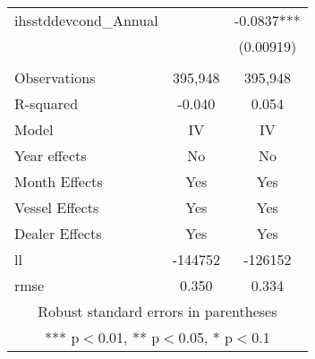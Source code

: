 \begin{tabular}{lcc}
ihsstddevcond\_Annual &  & -0.0837*** \\
 &  & (0.00919) \\
 &  &  \\
Observations & 395,948 & 395,948 \\
R-squared & -0.040 & 0.054 \\
Model & IV & IV \\
Year effects & No & No \\
Month Effects & Yes & Yes \\
Vessel Effects & Yes & Yes \\
Dealer Effects & Yes & Yes \\
ll & -144752 & -126152 \\
 rmse & 0.350 & 0.334 \\ \hline
\multicolumn{3}{c}{ Robust standard errors in parentheses} \\
\multicolumn{3}{c}{ *** p$<$0.01, ** p$<$0.05, * p$<$0.1} \\
\end{tabular}
